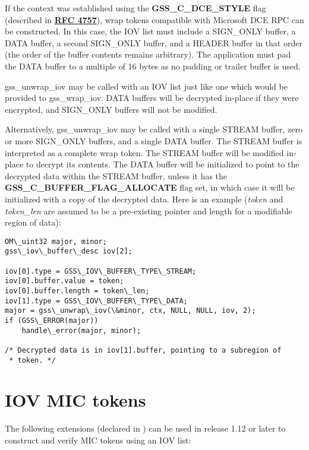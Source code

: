 \documentclass[letterpaper,10pt,english]{sphinxmanual}
\begin{document}
If the context was established using the \textbf{GSS\_C\_DCE\_STYLE} flag
(described in \href{http://tools.ietf.org/html/rfc4757.html}{\textbf{RFC 4757}}), wrap tokens compatible with Microsoft DCE
RPC can be constructed.  In this case, the IOV list must include a
SIGN\_ONLY buffer, a DATA buffer, a second SIGN\_ONLY buffer, and a
HEADER buffer in that order (the order of the buffer contents remains
arbitrary).  The application must pad the DATA buffer to a multiple of
16 bytes as no padding or trailer buffer is used.

gss\_unwrap\_iov may be called with an IOV list just like one which
would be provided to gss\_wrap\_iov.  DATA buffers will be decrypted
in-place if they were encrypted, and SIGN\_ONLY buffers will not be
modified.

Alternatively, gss\_unwrap\_iov may be called with a single STREAM
buffer, zero or more SIGN\_ONLY buffers, and a single DATA buffer.  The
STREAM buffer is interpreted as a complete wrap token.  The STREAM
buffer will be modified in-place to decrypt its contents.  The DATA
buffer will be initialized to point to the decrypted data within the
STREAM buffer, unless it has the \textbf{GSS\_C\_BUFFER\_FLAG\_ALLOCATE} flag
set, in which case it will be initialized with a copy of the decrypted
data.  Here is an example (\emph{token} and \emph{token\_len} are assumed to be a
pre-existing pointer and length for a modifiable region of data):

\begin{Verbatim}[commandchars=\\\{\}]
OM\_uint32 major, minor;
gss\_iov\_buffer\_desc iov[2];

iov[0].type = GSS\_IOV\_BUFFER\_TYPE\_STREAM;
iov[0].buffer.value = token;
iov[0].buffer.length = token\_len;
iov[1].type = GSS\_IOV\_BUFFER\_TYPE\_DATA;
major = gss\_unwrap\_iov(\&minor, ctx, NULL, NULL, iov, 2);
if (GSS\_ERROR(major))
    handle\_error(major, minor);

/* Decrypted data is in iov[1].buffer, pointing to a subregion of
 * token. */
\end{Verbatim}


\section{IOV MIC tokens}
\label{appdev/gssapi:iov-mic-tokens}
The following extensions (declared in ) can
be used in release 1.12 or later to construct and verify MIC tokens
using an IOV list:
\end{document}
